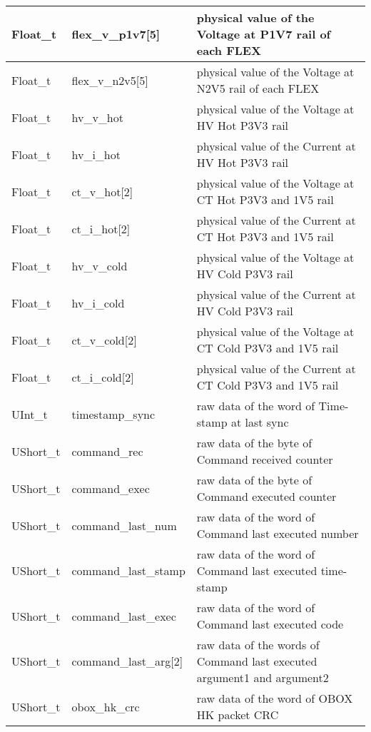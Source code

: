 \documentclass[a4paper, 12pt, onecolumn]{article}
\begin{document}
\begin{center}
\begin{supertabular}{| p{18mm} | p{38mm} | p{66mm} |}
    Float\_t    & flex\_v\_p1v7[5]         & physical value of the Voltage at P1V7 rail of each FLEX \\\hline
    Float\_t    & flex\_v\_n2v5[5]         & physical value of the Voltage at N2V5 rail of each FLEX \\\hline
    Float\_t    & hv\_v\_hot               & physical value of the Voltage at HV Hot P3V3 rail \\\hline
    Float\_t    & hv\_i\_hot               & physical value of the Current at HV Hot P3V3 rail \\\hline
    Float\_t    & ct\_v\_hot[2]            & physical value of the Voltage at CT Hot P3V3 and 1V5 rail \\\hline
    Float\_t    & ct\_i\_hot[2]            & physical value of the Current at CT Hot P3V3 and 1V5 rail \\\hline
    Float\_t    & hv\_v\_cold              & physical value of the Voltage at HV Cold P3V3 rail \\\hline
    Float\_t    & hv\_i\_cold              & physical value of the Current at HV Cold P3V3 rail \\\hline
    Float\_t    & ct\_v\_cold[2]           & physical value of the Voltage at CT Cold P3V3 and 1V5 rail \\\hline
    Float\_t    & ct\_i\_cold[2]           & physical value of the Current at CT Cold P3V3 and 1V5 rail \\\hline
    UInt\_t     & timestamp\_sync          & raw data of the word of Time-stamp at last sync \\\hline
    UShort\_t   & command\_rec             & raw data of the byte of Command received counter \\\hline
    UShort\_t   & command\_exec            & raw data of the byte of Command executed counter \\\hline
    UShort\_t   & command\_last\_num       & raw data of the word of Command last executed number \\\hline
    UShort\_t   & command\_last\_stamp     & raw data of the word of Command last executed time-stamp \\\hline
    UShort\_t   & command\_last\_exec      & raw data of the word of Command last executed code \\\hline
    UShort\_t   & command\_last\_arg[2]    & raw data of the words of Command last executed argument1 and argument2 \\\hline
    UShort\_t   & obox\_hk\_crc            & raw data of the word of OBOX HK packet CRC \\\hline

\end{supertabular}
\end{center}
\end{document}
